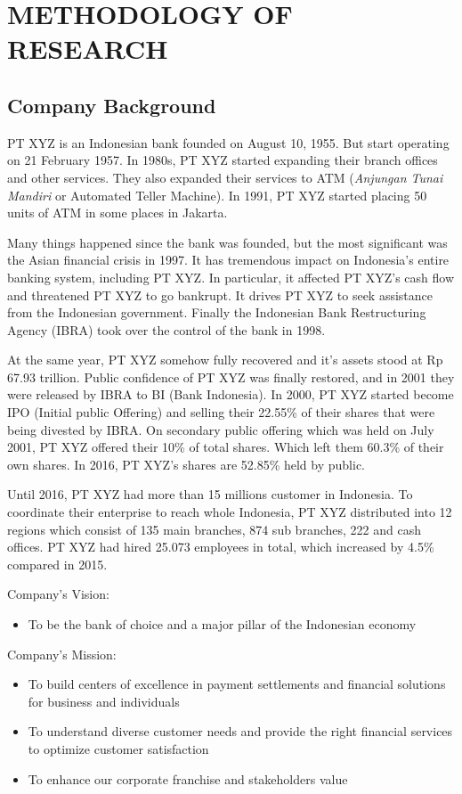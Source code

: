 \chapter{METHODOLOGY OF RESEARCH}
\section{Company Background}
PT XYZ is an Indonesian bank founded on August 10, 1955. But start operating on 21 February 1957. In 1980s, PT XYZ started expanding their branch offices and other services. They also expanded their services to ATM (\textit{Anjungan Tunai Mandiri} or Automated Teller Machine). In 1991, PT XYZ started placing 50 units of ATM in some places in Jakarta.

Many things happened since the bank was founded, but the most significant was the Asian financial crisis in 1997. It has tremendous impact on Indonesia's entire banking system, including PT XYZ. In particular, it affected PT XYZ's cash flow and threatened PT XYZ to go bankrupt. It drives PT XYZ to seek assistance from the Indonesian government. Finally the Indonesian Bank Restructuring Agency (IBRA) took over the control of the bank in 1998.

At the same year, PT XYZ somehow fully recovered and it's assets stood at Rp 67.93 trillion. Public confidence of PT XYZ was finally restored, and in 2001 they were released by IBRA to BI (Bank Indonesia). In 2000, PT XYZ started become IPO (Initial public Offering) and selling their 22.55\% of their shares that were being divested by IBRA. On secondary public offering which was held on July 2001, PT XYZ offered their 10\% of total shares. Which left them 60.3\% of their own shares. In 2016, PT XYZ's shares are 52.85\% held by public.

Until 2016, PT XYZ had more than 15 millions customer in Indonesia. To coordinate their enterprise to reach whole Indonesia, PT XYZ distributed into 12 regions which consist of 135 main branches, 874 sub branches, 222 and cash offices. PT XYZ had hired 25.073 employees in total, which increased by 4.5\% compared in 2015.

Company's Vision:
\begin{itemize}
	\itemsep0em
    \item To be the bank of choice and a major pillar of the Indonesian economy
\end{itemize}

Company's Mission:
\begin{itemize}
	\itemsep0em
    \item To build centers of excellence in payment settlements and financial solutions for business and individuals
    \item To understand diverse customer needs and provide the right financial services to optimize customer satisfaction
    \item To enhance our corporate franchise and stakeholders value
\end{itemize}

